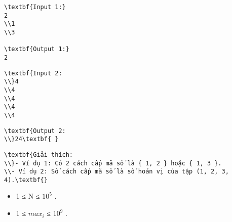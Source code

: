 \begin{verbatim}
\textbf{Input 1:}
2
\\1
\\3

\textbf{Output 1:}
2\end{verbatim}
\begin{verbatim}
\textbf{Input 2:
\\}4
\\4
\\4
\\4
\\4 \end{verbatim}
\begin{verbatim}
\textbf{Output 2:
\\}24\textbf{ }\end{verbatim}
\begin{verbatim}
\textbf{Giải thích:
\\}- Ví dụ 1: Có 2 cách cấp mã số là { 1, 2 } hoặc { 1, 3 }.
\\- Ví dụ 2: Số cách cấp mã số là số hoán vị của tập (1, 2, 3, 4).\textbf{}\end{verbatim}
\begin{itemize}
	\item     1 ≤ N ≤ $10^{5}$    .   
	\item     1 ≤ $max_{i}$    ≤ $10^{9}$    .   
\end{itemize}